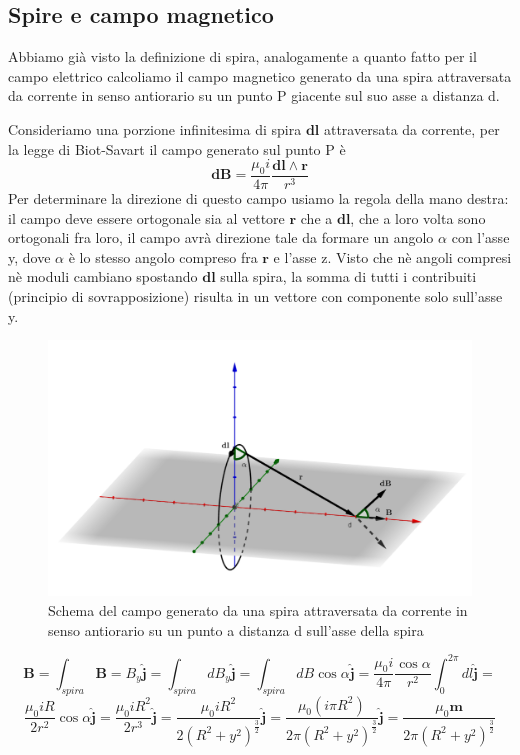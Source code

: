 \documentclass[
10pt, %
a4paper, %
oneside, %
headinclude,footinclude, %
BCOR5mm, %
]{scrartcl}
\begin{document}
\subsection{Spire e campo magnetico}
Abbiamo già visto la definizione di spira, analogamente a quanto fatto per il campo elettrico calcoliamo il campo magnetico generato da una spira attraversata da corrente in senso antiorario su un punto P giacente sul suo asse a distanza d. 
\begin{esercizio}
Consideriamo una porzione infinitesima di spira \(\mathbf{dl}\) attraversata da corrente, per la legge di Biot-Savart il campo generato sul punto P è
\[\mathbf{dB}=\frac{\mu_0 i}{4\pi}\frac{\mathbf{dl}\wedge\mathbf{r}}{r^3}\]
Per determinare la direzione di questo campo usiamo la regola della mano destra: il campo deve essere ortogonale sia al vettore \(\mathbf{r}\) che a \(\mathbf{dl}\), che a loro volta sono ortogonali fra loro, il campo avrà direzione tale da formare un angolo $\alpha$ con l'asse y, dove $\alpha$ è lo stesso angolo compreso fra \(\mathbf{r}\) e l'asse z. Visto che nè angoli compresi nè moduli cambiano spostando \(\mathbf{dl}\) sulla spira, la somma di tutti i contribuiti (principio di sovrapposizione) risulta in un vettore con componente solo sull'asse y. 
\begin{figure}[h!]
	\centering
	\includegraphics[width=0.7\linewidth]{images/campo_magnetico_spira}
	\caption{Schema del campo generato da una spira attraversata da corrente in senso antiorario su un punto a distanza d sull'asse della spira}
	\label{fig:campomagneticospira}
\end{figure}
\FloatBarrier
\[\mathbf{B}=\int_{spira}\mathbf{B}= B_y\mathbf{\hat{j}}=\int_{spira}dB_y\mathbf{\hat{j}}=\int_{spira}dB\cos\alpha\mathbf{\hat{j}}=\frac{\mu_0 i}{4\pi}\frac{\cos\alpha}{r^2}\int_{0}^{2\pi}dl\mathbf{\hat{j}}=\]
\[\frac{\mu_0 i R}{2r^2}\cos\alpha \mathbf{\hat{j}}=\frac{\mu_0 i R^2}{2r^3} \mathbf{\hat{j}}=\frac{\mu_0 i R^2}{2(R^2+y^2)^{\frac{3}{2}}} \mathbf{\hat{j}}=\frac{\mu_0 (i \pi R^2)}{2\pi(R^2+y^2)^{\frac{3}{2}}} \mathbf{\hat{j}}=\frac{\mu_0 \mathbf{m}}{2\pi(R^2+y^2)^{\frac{3}{2}}}\]

\end{esercizio}
\end{document}
